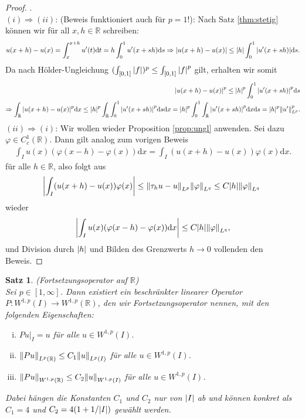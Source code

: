 \documentclass[twoside]{article}
\newcounter{lecnum}
\newtheorem{theorem}{Satz}[lecnum]
\theoremstyle{definition}
\begin{document}
\begin{proof}.\\
$(i) \Rightarrow (ii)$: (Beweis funktioniert auch für $p=1$!): Nach Satz \ref{thm:stetig} können wir für all $x, h \in \mathbb{R}$ schreiben:
\begin{align*}
u(x+h)-u(x) = \int_x^{x+h} u'(t) \mathrm{d}t = h \int_0^1 u'(x+sh) \mathrm{d}s \Rightarrow \abs{u(x+h)-u(x)} \leq \abs{h}  \int_0^1 \abs{u'(x+sh)} \mathrm{d}s.
\end{align*}
Da nach Hölder-Ungleichung $(\int_{[0,1]} \abs{f})^p \leq \int_{[0,1]} \abs{f}^p$ gilt, erhalten wir somit
\begin{align*}
\abs{u(x+h)-u(x)}^p \leq \abs{h}^p  \int_0^1 \abs{u'(x+sh)}^p \mathrm{d}s \\
\Rightarrow \int_\mathbb{R} \abs{u(x+h)-u(x)}^p \mathrm{d}x \leq \abs{h}^p \int_\mathbb{R} \int_0^1 \abs{u'(x+sh)}^p \mathrm{d}s \mathrm{d}x = \abs{h}^p \int_0^1 \int_\mathbb{R} \abs{u'(x+sh)}^p \mathrm{d}x \mathrm{d}s = \abs{h}^p \norm{u'}_{L^p}^p.
\end{align*}
$(ii) \Rightarrow (i)$: Wir wollen wieder Proposition \ref{prop:ungl} anwenden. Sei dazu $\varphi \in C_c^1(\mathbb{R})$. Dann gilt analog zum vorigen Beweis
\begin{align*}
\int_I u(x) (\varphi(x-h)-\varphi(x)) \mathrm{d}x = \int_I (u(x+h)-u(x)) \varphi(x) \mathrm{d}x.
\end{align*}
für alle $h \in \mathbb{R}$, also folgt aus
\begin{align*}
\abs{ \int_I (u(x+h)-u(x)) \varphi(x)} \leq \norm{\tau_h u - u}_{L^p} \norm{\varphi}_{L^q} \leq C \abs{h}  \norm{\varphi}_{L^q} \
\end{align*}
wieder 
\begin{align*}
\abs{\int_I u(x) (\varphi(x-h)-\varphi(x)) \mathrm{d}x} \leq C \abs{h}  \norm{\varphi}_{L^q},
\end{align*}
und Division durch $\abs{h}$ und Bilden des Grenzwerts $h \to 0$ vollenden den Beweis.
\end{proof}
\begin{theorem} (Fortsetzungsoperator auf $\mathbb{R}$) \label{thm:fort}\\
Sei $p \in [1,\infty]$. Dann existiert ein beschränkter linearer Operator $P:W^{1,p}(I) \to W^{1,p}(\mathbb{R})$, den wir Fortsetzungsoperator nennen, mit den folgenden Eigenschaften:
\begin{enumerate}[(i)]
\item $Pu|_I = u$ für alle $u \in W^{1,p}(I)$.
\item $\norm{Pu}_{L^p(\mathbb{R})} \leq C_1 \norm{u}_{L^{p}(I)}$ für alle $u \in W^{1,p}(I)$.
\item $\norm{Pu}_{W^{1,p}(\mathbb{R})} \leq C_2 \norm{u}_{W^{1,p}(I)}$ für alle $u \in W^{1,p}(I)$.
\end{enumerate}
Dabei hängen die Konstanten $C_1$ und $C_2$ nur von $\abs{I}$ ab und können konkret als $C_1 = 4$ und $C_2 = 4(1+1/\abs{I})$ gewählt werden. 
\end{theorem}
\end{document}
